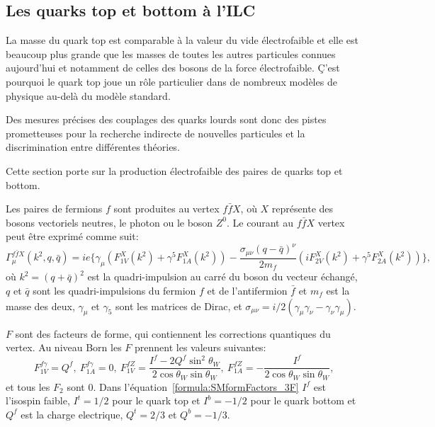 \subsection*{Les quarks top et bottom à l'ILC}

La masse du quark top est comparable à la valeur du vide électrofaible et elle est beaucoup plus grande que les masses de toutes les autres particules connues aujourd'hui et notamment de celles des bosons de la force électrofaible.
\c C'est pourquoi le quark top  joue un rôle particulier dans de nombreux modèles de physique au-delà du modèle standard.

Des mesures précises des couplages des quarks lourds sont donc des pistes prometteuses pour la recherche indirecte de nouvelles particules et la discrimination entre différentes théories.

Cette section porte sur la production électrofaible des paires de quarks top et bottom.

Les paires de fermions $f$ sont produites au vertex $f\bar{f}X$, où $X$ représente des bosons vectoriels neutres, le photon ou le boson $Z^0$. Le courant au $f\bar{f}X$ vertex peut être exprimé comme suit:
\begin{equation}
\Gamma^{f\bar{f}X}_\mu (k^2,q,\bar{q}) = ie\{ \gamma_\mu (F^X_{1V}(k^2) + \gamma^5 F^X_{1A}(k^2)) - \frac{\sigma_{\mu\nu}(q-\bar{q})^\nu}{2m_f}(iF^X_{2V}(k^2) + \gamma^5 F^X_{2A}(k^2)) \},
\end{equation}
où $k^2= (q+\bar{q})^2$ est la quadri-impulsion au carré du boson du vecteur échangé, $q$ et $\bar{q} $ sont les quadri-impulsions du fermion $f$ et de l'antifermion $\bar{f}$ et $m_f$ est la masse des deux,  $\gamma_\mu$ et $\gamma_5$ sont les matrices de Dirac, et $\sigma_{\mu\nu} = i/2(\gamma_\mu\gamma_\nu - \gamma_\nu\gamma_\mu)$.

$F$ sont des facteurs de forme, qui contiennent les corrections quantiques du vertex. Au niveau Born les $F$ prennent les valeurs suivantes:  
\begin{equation}
F^{f\gamma}_{1V} = Q^{f}, \ F^{f\gamma}_{1A} = 0, \ F^{fZ}_{1V} = \frac{I^f - 2Q^f\sin^2\theta_W}{2\cos\theta_W\sin\theta_W}, \ F^{fZ}_{1A} = - \frac{I^f}{2\cos\theta_W\sin\theta_W},
\label{formula:SMformFactors_3F}
\end{equation}
et tous les $F_2$ sont 0. Dans l'équation~\ref{formula:SMformFactors_3F} $I^f$ est  l'isospin faible, $I^t = 1/2$ pour le quark top et $I^b = -1/2$ pour le quark bottom  et $Q^f$ est la charge electrique, $Q^t = 2/3$ et $Q^b = -1/3$.


